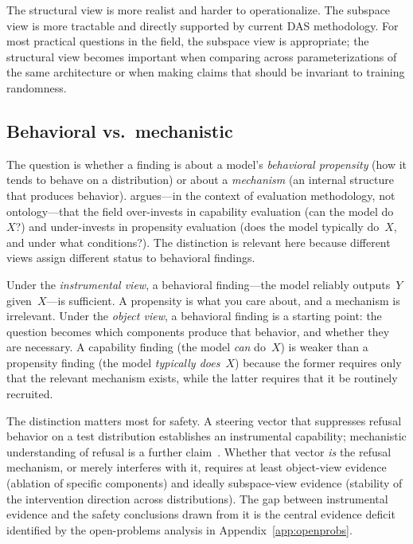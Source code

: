 \documentclass{article}
\begin{document}
The structural view is more realist and harder to operationalize.  The
subspace view is more tractable and directly supported by current DAS
methodology.  For most practical questions in the field, the subspace
view is appropriate; the structural view becomes important when
comparing across parameterizations of the same architecture or when
making claims that should be invariant to training randomness.

\subsection{Behavioral vs.\ mechanistic}

The question is whether a finding is about a model's \emph{behavioral
propensity} (how it tends to behave on a distribution) or about a
\emph{mechanism} (an internal structure that produces behavior).
\citet{steinhardt2026} argues---in the context of evaluation
methodology, not ontology---that the field over-invests in capability
evaluation (can the model do~$X$?) and under-invests in propensity
evaluation (does the model typically do~$X$, and under what conditions?).
The distinction is relevant here because different views assign
different status to behavioral findings.

Under the \emph{instrumental view}, a behavioral finding---the model
reliably outputs~$Y$ given~$X$---is sufficient.  A propensity is what
you care about, and a mechanism is irrelevant.  Under the \emph{object
view}, a behavioral finding is a starting point: the question becomes
which components produce that behavior, and whether they are
necessary.  A capability finding (the model \emph{can} do~$X$) is
weaker than a propensity finding (the model \emph{typically does}~$X$)
because the former requires only that the relevant mechanism exists,
while the latter requires that it be routinely recruited.

The distinction matters most for safety.  A steering vector that
suppresses refusal behavior on a test distribution establishes an
instrumental capability; mechanistic understanding of refusal is a further
claim~\citep{turner2024}.  Whether that vector \emph{is} the refusal
mechanism, or merely interferes with it, requires at least object-view
evidence (ablation of specific components) and ideally subspace-view
evidence (stability of the intervention direction across distributions).
The gap between instrumental evidence and the safety conclusions drawn
from it is the central evidence deficit identified by the open-problems
analysis in Appendix~\ref{app:openprobs}.
\end{document}
